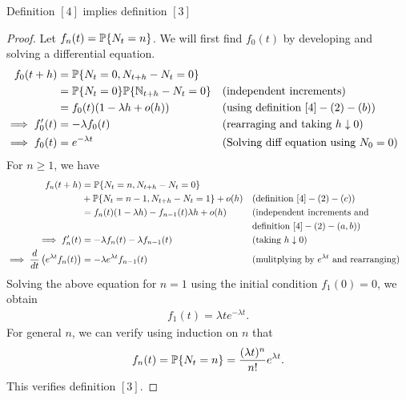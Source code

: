 \documentclass[all-lectures.tex]{subfiles}
\begin{document}
\begin{prop}
Definition $[4]$ implies definition $[3]$
\end{prop}
\begin{proof}
Let $f_n(t) = \P\{N_t = n\}$. We will first find $f_0(t)$ by developing and solving a differential equation.
\begin{align*}
f_0(t+h) &= \P\{N_t = 0,N_{t+h} - N_t = 0\} \\
&= \P\{N_t = 0\} \P\{\N_{t+h} - N_t = 0\} && \text{(independent increments)}\\
&= f_0(t) (1- \lambda h + o(h)) && \text{(using definition $[4]-(2)-(b)$)}\\
\implies f'_0(t) &= -\lambda f_0(t) &&  \text{(rearraging and taking $h \downarrow 0$)} \\
\implies f_0(t) &= e^{-\lambda t} && \text{(Solving diff equation using $N_0 = 0$)}  \\ 
\end{align*} 
For $n \geq 1$, we have
\begin{align*}
f_n(t+h) &= \P\{N_t = n,N_{t+h} - N_t = 0\} \\ &+\P\{N_t = n-1,N_{t+h} - N_t = 1\} + o(h) && \text{(definition $[4]-(2)-(c)$)}\\
&= f_n(t) (1-\lambda h) - f_{n-1}(t)\lambda h + o(h) && \text{(independent increments and} \\& &&\text{definition $[4]-(2)-(a,b)$)}\\
\implies f'_n(t) &= - \lambda f_n(t) - \lambda f_{n-1}(t) &&\text{(taking $h \downarrow 0$)} \\
\implies \frac{d}{dt}  \left( e^{\lambda t}f_n(t) \right)  &= - \lambda e^{\lambda t} f_{n-1}(t) && \text{(mulitplying by $e^{\lambda t}$ and rearranging)} \\
\end{align*} 
Solving the above equation for $n=1$ using the initial condition $f_1(0) = 0$, we obtain
\begin{align*}
f_1(t) = \lambda t e^{-\lambda t}.
\end{align*}
For general $n$, we can verify using induction on $n$ that
\begin{align*}
f_n(t) = \P\{N_t = n \} = \frac{(\lambda t)^n}{n!} e^{\lambda t}.
\end{align*}
This verifies definition $[3]$. \qedhere
\end{proof}
\end{document}
